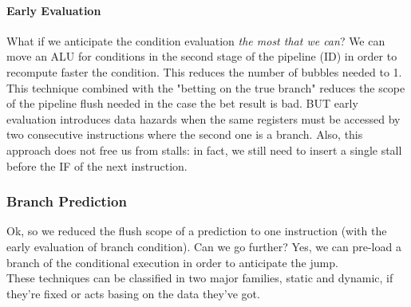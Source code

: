 \documentclass[10pt,a4paper]{article}
\begin{document}
				\paragraph{Early Evaluation}
					What if we anticipate the condition evaluation \emph{the most that we can}? We can move an ALU for conditions in the second stage of the pipeline (ID) in order to recompute faster the condition. This reduces the number of bubbles needed to 1.\\
					This technique combined with the "betting on the true branch" reduces the scope of the pipeline flush needed in the case the bet result is bad. BUT early evaluation introduces data hazards when the same registers must be accessed by two consecutive instructions where the second one is a branch. Also, this approach does not free us from stalls: in fact, we still need to insert a single stall before the IF of the next instruction.
					
				\subsubsection{Branch Prediction}
					Ok, so we reduced the flush scope of a prediction to one instruction (with the early evaluation of branch condition). Can we go further? Yes, we can pre-load a branch of the conditional execution in order to anticipate the jump.\\
					These techniques can be classified in two major families, static and dynamic, if they're fixed or acts basing on the data they've got.
					
\end{document}

